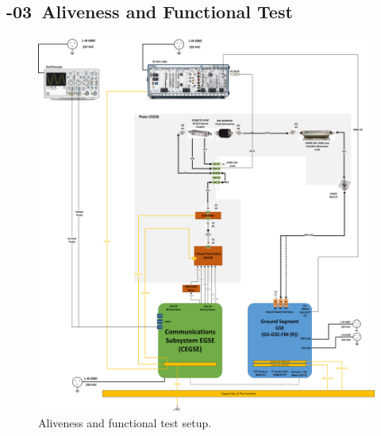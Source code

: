 \setcounter{Sec}{0}\setcounter{Step}{0}

\newpage
\renewcommand{\subprocid}{{\procid}-03}

\newpage
\subsection{\subprocid \ Aliveness and Functional Test}


\begin{figure}[H]
	\centering
	  \includegraphics[width=.9\linewidth]{figuras/EWC30PXISetupB.png}  
	  \caption{Aliveness and functional test setup.}
	\label{fig:setup_xband_funcional}
	\end{figure}
\newpage
